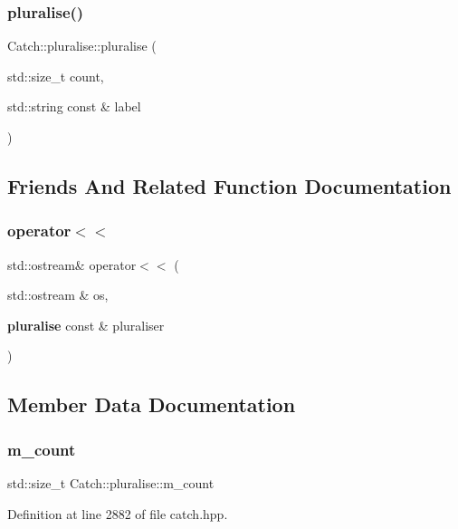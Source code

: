 \subsubsection{pluralise()}
{\footnotesize\ttfamily Catch\+::pluralise\+::pluralise (\begin{DoxyParamCaption}\item[{std\+::size\+\_\+t}]{count,  }\item[{std\+::string const \&}]{label }\end{DoxyParamCaption})}



\subsection{Friends And Related Function Documentation}
\mbox{\label{struct_catch_1_1pluralise_aa7dac6b165514c1f85e0695d678fdef5}} 
\subsubsection{operator$<$$<$}
{\footnotesize\ttfamily std\+::ostream\& operator$<$$<$ (\begin{DoxyParamCaption}\item[{std\+::ostream \&}]{os,  }\item[{\textbf{ pluralise} const \&}]{pluraliser }\end{DoxyParamCaption})\hspace{0.3cm}{\ttfamily [friend]}}



\subsection{Member Data Documentation}
\mbox{\label{struct_catch_1_1pluralise_a4dce2fa13ec6f00fac09b2418265441e}} 
\subsubsection{m\_count}
{\footnotesize\ttfamily std\+::size\+\_\+t Catch\+::pluralise\+::m\+\_\+count}



Definition at line 2882 of file catch.\+hpp.

\mbox{\label{struct_catch_1_1pluralise_a8849cbdd3f11ebe7747597c8644e8793}} 
